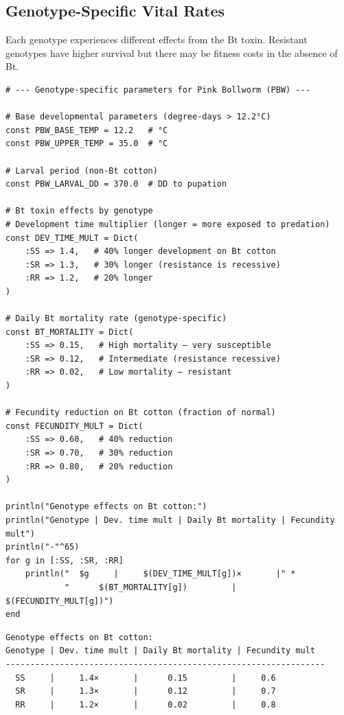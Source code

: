 \subsection{Genotype-Specific Vital Rates}



\label{13347431591729264399}{}


Each genotype experiences different effects from the Bt toxin. Resistant genotypes have higher survival but there may be fitness costs in the absence of Bt.




\begin{verbatim}
# --- Genotype-specific parameters for Pink Bollworm (PBW) ---

# Base developmental parameters (degree-days > 12.2°C)
const PBW_BASE_TEMP = 12.2   # °C
const PBW_UPPER_TEMP = 35.0  # °C

# Larval period (non-Bt cotton)
const PBW_LARVAL_DD = 370.0  # DD to pupation

# Bt toxin effects by genotype
# Development time multiplier (longer = more exposed to predation)
const DEV_TIME_MULT = Dict(
    :SS => 1.4,   # 40% longer development on Bt cotton
    :SR => 1.3,   # 30% longer (resistance is recessive)
    :RR => 1.2,   # 20% longer
)

# Daily Bt mortality rate (genotype-specific)
const BT_MORTALITY = Dict(
    :SS => 0.15,   # High mortality — very susceptible
    :SR => 0.12,   # Intermediate (resistance recessive)
    :RR => 0.02,   # Low mortality — resistant
)

# Fecundity reduction on Bt cotton (fraction of normal)
const FECUNDITY_MULT = Dict(
    :SS => 0.60,   # 40% reduction
    :SR => 0.70,   # 30% reduction
    :RR => 0.80,   # 20% reduction
)

println("Genotype effects on Bt cotton:")
println("Genotype | Dev. time mult | Daily Bt mortality | Fecundity mult")
println("-"^65)
for g in [:SS, :SR, :RR]
    println("  $g     |     $(DEV_TIME_MULT[g])×       |" *
            "      $(BT_MORTALITY[g])         |     $(FECUNDITY_MULT[g])")
end
\end{verbatim}




\begin{verbatim}
Genotype effects on Bt cotton:
Genotype | Dev. time mult | Daily Bt mortality | Fecundity mult
-----------------------------------------------------------------
  SS     |     1.4×       |      0.15         |     0.6
  SR     |     1.3×       |      0.12         |     0.7
  RR     |     1.2×       |      0.02         |     0.8
\end{verbatim}




